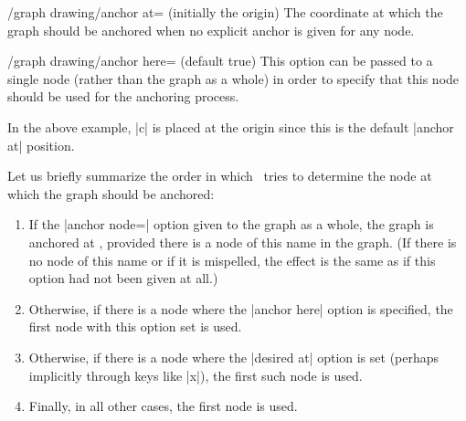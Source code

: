 \begin{key}{/graph drawing/anchor at= (initially the origin)}
  The coordinate at which the graph should be anchored when no
  explicit anchor is given for any node.
\begin{codeexample}[]
\end{codeexample}
\end{key}

\begin{key}{/graph drawing/anchor here= (default true)}
  This option can be passed to a single node (rather than the graph as
  a whole) in order to specify that this node should be used for the
  anchoring process.
\begin{codeexample}[]
\end{codeexample}
  In the above example, |c| is placed at the origin since this is the
  default |anchor at| position.
\end{key}

Let us briefly summarize the order in which \tikzname\ tries to
determine the node at which the graph should be anchored:
\begin{enumerate}
\item If the |anchor node=| option given to the graph
  as a whole, the graph is anchored at , provided
  there is a node of this name in the graph. (If there is no node of
  this name or if it is mispelled, the effect is the same as if this
  option had not been given at all.)
\item Otherwise, if there is a node where the |anchor here| option is
  specified, the first node with this option set is used.
\item Otherwise, if there is a node where the |desired at| option is
  set (perhaps implicitly through keys like |x|), the first such node
  is used.
\item Finally, in all other cases, the first node is used.
\end{enumerate}

